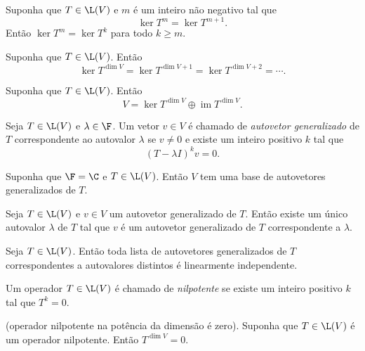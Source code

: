 \documentclass{article}
\DeclareMathOperator{\im}{im}
\begin{document}
\begin{prop}
    Suponha que \(T \in \L(V)\) e \(m\) é um inteiro não negativo tal que 
    \[
        \ker T^m = \ker T^{m+1}.
    \]
    \noindent Então \(\ker T^m = \ker T^k\) para todo \(k \geq m\).
\end{prop}

\begin{prop} 
    Suponha que \(T \in \L(V)\). Então 
    \[
        \ker T^{\dim V} = \ker T^{\dim V + 1} = \ker T^{\dim V + 2} = \cdots .
    \]
\end{prop}

\begin{prop}
    Suponha que \(T \in \L(V)\). Então
    \begin{equation}
        V = \ker T^{\dim V} \oplus \im T^{\dim V}.
    \end{equation}
\end{prop}

\begin{defn}
    Seja \(T \in \L(V)\) e \(\lambda \in \F\). Um vetor \(v \in V\) é chamado de \emph{autovetor generalizado} de \(T\) correspondente ao autovalor \(\lambda\) se \(v \neq 0\) e existe um inteiro positivo \(k\) tal que
    \[
        (T - \lambda I)^k v = 0.
    \]
\end{defn}

\begin{prop}
    Suponha que \(\F = \C\) e \(T \in \L(V)\). Então \(V\) tem uma base de autovetores generalizados de \(T\).
\end{prop}

\begin{prop} 
    Seja \(T \in \L(V)\) e \(v \in V\) um autovetor generalizado de \(T\). Então existe um único autovalor \(\lambda\) de \(T\) tal que \(v\) é um autovetor generalizado de \(T\) correspondente a \(\lambda\).
\end{prop}

\begin{prop}
    Seja \(T \in \L(V)\). Então toda lista de autovetores generalizados de \(T\) correspondentes a autovalores distintos é linearmente independente.
\end{prop}

\begin{defn}
    Um operador \(T \in \L(V)\) é chamado de \emph{nilpotente} se existe um inteiro positivo \(k\) tal que \(T^k = 0\).
\end{defn}

\begin{prop} (operador nilpotente na potência da dimensão é zero).
    Suponha que \(T \in \L(V)\) é um operador nilpotente. Então \(T^{\dim V} = 0\).
\end{prop}
\end{document}
